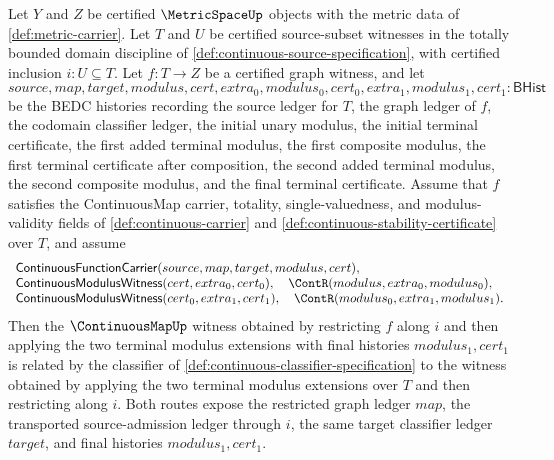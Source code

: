 \begin{theorem}
\label{thm:uniform-continuity-restriction-iterated-terminal-modulus-commutes}
Let $Y$ and $Z$ be certified $\MetricSpaceUp$ objects with the metric data of \autoref{def:metric-carrier}. Let $T$ and $U$ be certified source-subset witnesses in the totally bounded domain discipline of \autoref{def:continuous-source-specification}, with certified inclusion $i:U\subseteq T$. Let $f:T\to Z$ be a certified graph witness, and let
$$
source,map,target,modulus,cert,extra_0,modulus_0,cert_0,extra_1,modulus_1,cert_1:\mathsf{BHist}
$$
be the BEDC histories recording the source ledger for $T$, the graph ledger of $f$, the codomain classifier ledger, the initial unary modulus, the initial terminal certificate, the first added terminal modulus, the first composite modulus, the first terminal certificate after composition, the second added terminal modulus, the second composite modulus, and the final terminal certificate. Assume that $f$ satisfies the ContinuousMap carrier, totality, single-valuedness, and modulus-validity fields of \autoref{def:continuous-carrier} and \autoref{def:continuous-stability-certificate} over $T$, and assume
$$
\begin{array}{l}
\mathsf{ContinuousFunctionCarrier}(source,map,target,modulus,cert),\\
\mathsf{ContinuousModulusWitness}(cert,extra_0,cert_0),\quad \ContR(modulus,extra_0,modulus_0),\\
\mathsf{ContinuousModulusWitness}(cert_0,extra_1,cert_1),\quad \ContR(modulus_0,extra_1,modulus_1).
\end{array}
$$
Then the $\ContinuousMapUp$ witness obtained by restricting $f$ along $i$ and then applying the two terminal modulus extensions with final histories $modulus_1,cert_1$ is related by the classifier of \autoref{def:continuous-classifier-specification} to the witness obtained by applying the two terminal modulus extensions over $T$ and then restricting along $i$. Both routes expose the restricted graph ledger $map$, the transported source-admission ledger through $i$, the same target classifier ledger $target$, and final histories $modulus_1,cert_1$.
\end{theorem}

